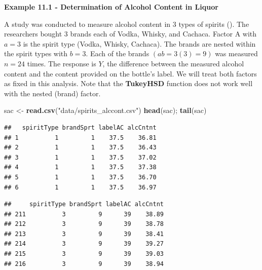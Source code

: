 \documentclass[
]{book}
\newenvironment{Shaded}{\begin{snugshade}}{\end{snugshade}}
\newcommand{\AttributeTok}[1]{\textcolor[rgb]{0.13,0.29,0.53}{#1}}
\newcommand{\DecValTok}[1]{\textcolor[rgb]{0.00,0.00,0.81}{#1}}
\newcommand{\FloatTok}[1]{\textcolor[rgb]{0.00,0.00,0.81}{#1}}
\newcommand{\FunctionTok}[1]{\textcolor[rgb]{0.13,0.29,0.53}{\textbf{#1}}}
\newcommand{\NormalTok}[1]{#1}
\newcommand{\OtherTok}[1]{\textcolor[rgb]{0.56,0.35,0.01}{#1}}
\newcommand{\SpecialCharTok}[1]{\textcolor[rgb]{0.81,0.36,0.00}{\textbf{#1}}}
\newcommand{\StringTok}[1]{\textcolor[rgb]{0.31,0.60,0.02}{#1}}
\begin{document}
\textbf{Example 11.1 - Determination of Alcohol Content in Liquor}

A study was conducted to measure alcohol content in 3 types of spirits
(). The researchers
bought 3 brands each of Vodka, Whisky, and Cachaca. Factor A with
\(a=3\) is the spirit type (Vodka, Whisky, Cachaca). The brands are
nested within the spirit types with \(b=3\). Each of the brands
\((ab=3(3)=9)\) was measured \(n=24\) times. The response is \(Y\), the
difference between the measured alcohol content and the content provided
on the bottle's label. We will treat both factors as fixed in this
analysis. Note that the \textbf{TukeyHSD} function does not work well
with the nested (brand) factor.

\begin{Shaded}
\begin{Highlighting}[]
\NormalTok{sac }\OtherTok{\textless{}{-}} \FunctionTok{read.csv}\NormalTok{(}\StringTok{"data/spirits\_alccont.csv"}\NormalTok{)}
\FunctionTok{head}\NormalTok{(sac); }\FunctionTok{tail}\NormalTok{(sac)}
\end{Highlighting}
\end{Shaded}

\begin{verbatim}
##   spiritType brandSprt labelAC alcCntnt
## 1          1         1    37.5    36.81
## 2          1         1    37.5    36.43
## 3          1         1    37.5    37.02
## 4          1         1    37.5    37.38
## 5          1         1    37.5    36.70
## 6          1         1    37.5    36.97
\end{verbatim}

\begin{verbatim}
##     spiritType brandSprt labelAC alcCntnt
## 211          3         9      39    38.89
## 212          3         9      39    38.78
## 213          3         9      39    38.41
## 214          3         9      39    39.27
## 215          3         9      39    39.03
## 216          3         9      39    38.94
\end{verbatim}

\begin{Shaded}
\end{Shaded}
\end{document}
